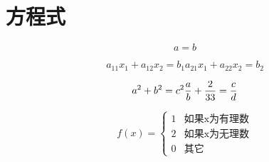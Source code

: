 \section{方程式}
\begin{equation*}
  a=b
\end{equation*}


\begin{equation}
  a_{11} x_1+a_{12}x_2 = b_1
  a_{21}x_1+a_{22}x_2 = b_2
\end{equation}

\begin{equation}
  a^2 + b^2 = c^2\\
  \frac{a}{b}+\frac2{33}=\frac{c}{d}
\end{equation}

\begin{equation} f(x) =
  \begin{cases}
    1 & \text{如果x为有理数} \\
    2 & \text{如果x为无理数} \\
    0 & \text{其它}
  \end{cases}
\end{equation}


